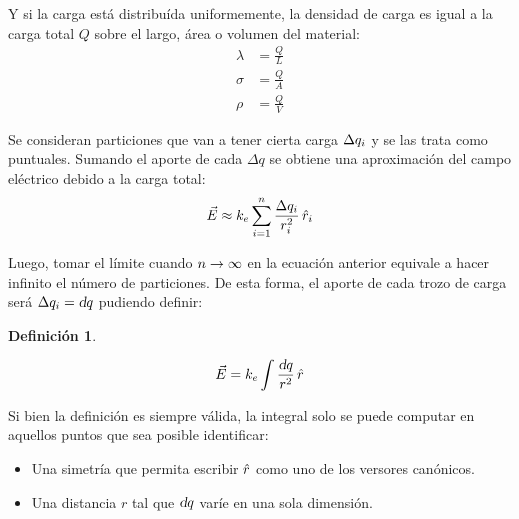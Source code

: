 \documentclass[a5paper,12pt,twoside]{book}
\newtheorem{defn}{{Definición}}[chapter]
\begin{document}
Y si la carga está distribuída uniformemente, la densidad de carga es igual a la carga total $Q$ sobre el largo, área o volumen del material:
\begin{align*}
    \lambda &= \frac{Q}{L}
    \\[1ex]
    \sigma &= \frac{Q}{A}
    \\[1ex]
    \rho &= \frac{Q}{V}
\end{align*}

Se consideran particiones que van a tener cierta carga $\Delta q_i$ y se las trata como puntuales.
Sumando el aporte de cada $\Delta q$ se obtiene una aproximación del campo eléctrico debido a la carga total:
\begin{equation*}
    \Vec{E} \approx k_e \sum_{i=1}^n \frac{\Delta q_i}{r_i^2} \, \hat{r}_i
\end{equation*}

Luego, tomar el límite cuando $n\to\infty$ en la ecuación anterior equivale a hacer infinito el número de particiones.
De esta forma, el aporte de cada trozo de carga será $\Delta q_i = \textsl{d} q$ pudiendo definir:

\begin{mdframed}[style=MyFrame1]
    \begin{defn}
    \end{defn}
    \begin{equation*}
        \Vec{E} = k_e \int \frac{\textsl{d} q}{r^2} \, \hat{r}
    \end{equation*}
\end{mdframed}

Si bien la definición es siempre válida, la integral solo se puede computar en aquellos puntos que sea posible identificar:
\begin{itemize}
    \item Una simetría que permita escribir $\hat{r}$ como uno de los versores canónicos.
    \item Una distancia $r$ tal que $\textsl{d} q$ varíe en una sola dimensión.
\end{itemize}
\end{document}
